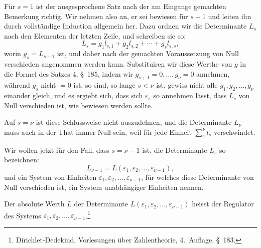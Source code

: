 \documentclass[11pt]{article}
\begin{document}
Für $s=1$ ist der ausgesprochene Satz nach der am Eingange gemachten Bemerkung richtig. Wir nehmen also an, er
sei bewiesen für $s-1$ und leiten ihn durch vollständige Induction allgemein her. Dazu ordnen wir die Determinante $L_s$ nach den Elementen der letzten Zeile, und schreiben sie so:
\begin{equation}
L_s=g_1l_{s,1}+g_2l_{s,2}+\cdots+g_sl_{s,s},
\tag{2}
\end{equation}
worin $g_s=L_{s-1}$ ist, und daher nach der gemachten Voraussetzung von Null verschieden angenommen werden kann. Substituiren wir diese Werthe von $g$ in die Formel des Satzes 4, \S~185, indem wir $g_{s+1}=0,\ldots,g_\nu=0$ annehmen, während $g_s$ nicht $=0$ ist, so sind, so lange $s<\nu$ ist, gewiss nicht alle $g_1,g_2,\ldots,g_\nu$ einander gleich, und es ergiebt sich, dass sich $\varepsilon_s$ so annehmen lässt, dass $L_s$ von Null verschieden ist, wie bewiesen werden sollte.

Auf $s=\nu$ ist diese Schlussweise nicht auszudehnen, und die Determinante $L_\nu$ muss auch in der That immer Null sein, weil für jede Einheit $\sum_{1}^{\nu} l_s$ verschwindet.

Wir wollen jetzt für den Fall, dass $s=\nu-1$ ist, die Determinante $L_s$ so bezeichnen:
\begin{equation}
L_{\nu-1}=L(\varepsilon_1,\varepsilon_2,\ldots,\varepsilon_{\nu-1}),
\tag{3}
\end{equation}
und ein System von Einheiten $\varepsilon_1,\varepsilon_2,\ldots,\varepsilon_{\nu-1}$, für welches diese Determinante von Null verschieden ist, ein System unabhängiger Einheiten nennen.

Der absolute Werth $L$ der Determinante $L(\varepsilon_1,\varepsilon_2,\ldots,\varepsilon_{\nu-1})$ heisst der Regulator des Systems $\varepsilon_1,\varepsilon_2,\ldots,\varepsilon_{\nu-1}$.\footnote{Dirichlet-Dedekind, Vorlesungen über Zahlentheorie, 4.~Auflage, \S~183.}
\end{document}

